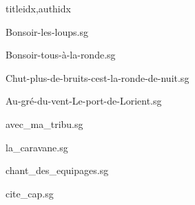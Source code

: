 \documentclass[12pt]{article}
\begin{document}
\begin{songs}{titleidx,authidx}

{Bonsoir-les-loups.sg}


{Bonsoir-tous-à-la-ronde.sg}


{Chut-plus-de-bruits-cest-la-ronde-de-nuit.sg}


{Au-gré-du-vent-Le-port-de-Lorient.sg}


{avec_ma_tribu.sg}


{la_caravane.sg}


{chant_des_equipages.sg}


{cite_cap.sg}



\end{songs}
\end{document}
